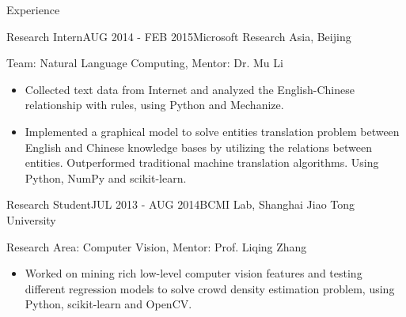 \documentclass{resume} %
\begin{document}
\begin{rSection}{Experience}
\begin{rSubsection}{Research Intern}{AUG 2014 - FEB 2015}{Microsoft Research Asia, Beijing}

Team: Natural Language Computing, Mentor: Dr. Mu Li
\begin{itemize}
\item Collected text data from Internet and analyzed the English-Chinese relationship with rules, using Python and Mechanize.
\item Implemented a graphical model to solve entities translation problem between English and Chinese knowledge bases by utilizing the relations between entities. Outperformed traditional machine translation algorithms. Using Python, NumPy and scikit-learn.
\end{itemize}
\end{rSubsection}
\vspace{5pt}
\begin{rSubsection}{Research Student}{JUL 2013 - AUG 2014}{BCMI Lab, Shanghai Jiao Tong University}

Research Area: Computer Vision, Mentor: Prof. Liqing Zhang
\begin{itemize}
\item Worked on mining rich low-level computer vision features and testing different regression models to solve crowd density estimation problem, using Python, scikit-learn and OpenCV.
\end{itemize}
\end{rSubsection}
\end{rSection}
\vspace{10pt}
\end{document}
